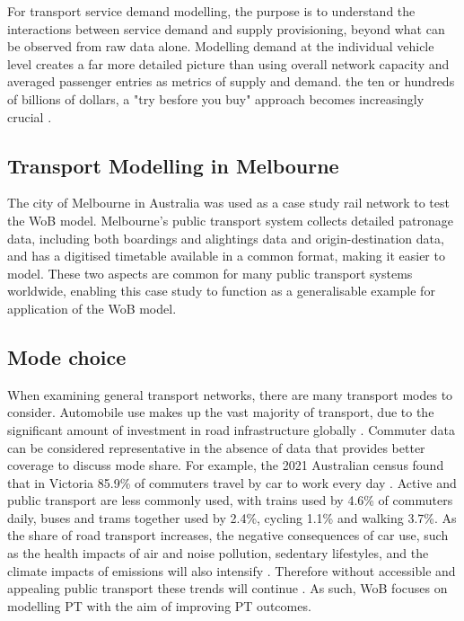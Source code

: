 For transport service demand modelling, the purpose is to understand the interactions between service demand and supply provisioning, beyond what can be observed from raw data alone. Modelling demand at the individual vehicle level creates a far more detailed picture than using overall network capacity and averaged passenger entries as metrics of supply and demand. the ten or hundreds of billions of dollars, a "try besfore you buy" approach becomes increasingly crucial \cite[p.~12]{victorianparliamentarybudgetofficeSuburbanRailLoop2024}.

\subsection{Transport Modelling in Melbourne}
The city of Melbourne in Australia was used as a case study rail network to test the WoB model. Melbourne's public transport system collects detailed patronage data, including both boardings and alightings data and origin-destination data, and has a digitised timetable available in a common format, making it easier to model. These two aspects are common for many public transport systems worldwide, enabling this case study to function as a generalisable example for application of the WoB model. 

\subsection{Mode choice}
When examining general transport networks, there are many transport modes to consider. Automobile use makes up the vast majority of transport, due to the significant amount of investment in road infrastructure globally \cite{minerCarHarmGlobal2024, prieto-curielABCMobility2024}. Commuter data can be considered representative in the absence of data that provides better coverage to discuss mode share. For example, the 2021 Australian census found that in Victoria 85.9\% of commuters travel by car to work every day \cite{australianbureauofstatisticsCensusPopulationHousing2021}. Active and public transport are less commonly used, with trains used by 4.6\% of commuters daily, buses and trams together used by 2.4\%, cycling 1.1\% and walking 3.7\%. As the share of road transport increases, the negative consequences of car use, such as the health impacts of air and noise pollution, sedentary lifestyles, and the climate impacts of emissions will also intensify \cite{frankPathwaysBuiltEnvironment2019, macleodCommutingWorkPostpandemic2022}. Therefore without accessible and appealing public transport these trends will continue \cite{currieAlarmingTrendsGrowth2018, minerCarHarmGlobal2024}. As such, WoB focuses on modelling PT with the aim of improving PT outcomes.

